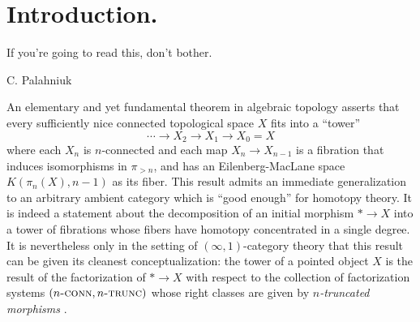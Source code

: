 

\section{Introduction.}\label{abs-intro}
\begin{modifyepigraph}{.5}
\epigraph{If you're going to read this, don't bother.}{C. Palahniuk}
\end{modifyepigraph}

An elementary and yet fundamental theorem in algebraic topology asserts that every sufficiently nice connected topological space $X$ fits into a ``tower''
\[
\cdots \to X_2\to X_1\to X_0=X
\]
 where each $X_n$ is $n$-connected and each map $X_n\to X_{n-1}$ is a fibration that induces isomorphisms in $\pi_{>n}$, and has an Eilenberg-MacLane space $K(\pi_{n}(X),n-1)$ as its fiber.
This result admits an immediate generalization to an arbitrary ambient category which is ``good enough'' for homotopy theory. It is indeed a statement
about the decomposition of an initial morphism $* \to X$ into a tower of fibrations 
whose fibers have homotopy concentrated in a single degree. It is nevertheless only in the setting of $(\infty,1)$-category theory that this result can be given its cleanest conceptualization: the tower of a pointed object $X$ 
is the result of the factorization of $* \to X$ with respect to 
the collection of factorization systems $(n\textsc{-conn}, n\textsc{-trunc})$ whose right classes are given by \emph{$n$-truncated morphisms} \cite{HTT}.

